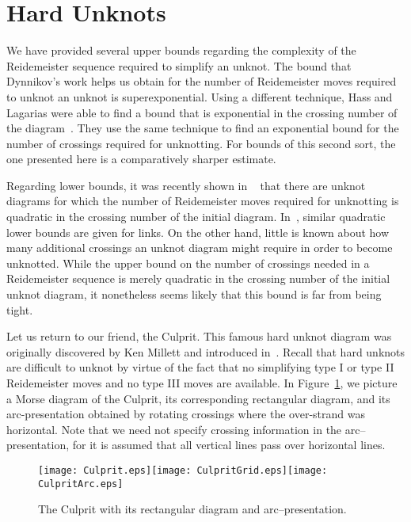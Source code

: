 \documentclass{amsart}
\begin{document}
\section{Hard Unknots}


We have provided several upper bounds regarding the complexity of the Reidemeister sequence required to simplify an unknot. The bound that Dynnikov's work helps us obtain for the number of Reidemeister moves required to unknot an unknot is superexponential. Using a different technique, Hass and Lagarias were able to find a bound that is exponential in the crossing number of the diagram~\cite{hl}. They use the same technique to find an exponential bound for the number of crossings required for unknotting. For bounds of this second sort, the one presented here is a comparatively sharper estimate. 

Regarding lower bounds, it was recently shown in ~\cite{hn} that there are unknot diagrams for which the number of Reidemeister moves required for unknotting is quadratic in the crossing number of the initial diagram. In~\cite{hayashi}, similar quadratic lower bounds are given for links. On the other hand, little is known about how many additional crossings an unknot diagram might require in order to become unknotted. While the upper bound on the number of crossings needed in a Reidemeister sequence is merely quadratic in the crossing number of the initial unknot diagram, it nonetheless seems likely that this bound is far from being tight. 

Let us return to our friend, the Culprit. This famous hard unknot diagram was originally discovered by Ken Millett and introduced in~\cite{Culprit}. Recall that hard unknots are difficult to unknot by virtue of the fact that no simplifying type I or type II Reidemeister moves and no type III moves are available. In Figure~\ref{culprit}, we picture a Morse diagram of the Culprit, its corresponding rectangular diagram, and its arc-presentation obtained by rotating crossings where the over-strand was horizontal. Note that we need not specify crossing information in the arc--presentation, for it is assumed that all vertical lines pass over horizontal lines.

\begin{figure}[h]
\begin{center}
\texttt{[image: Culprit.eps]}\texttt{[image: CulpritGrid.eps]}\texttt{[image: CulpritArc.eps]}
\end{center}
\caption{ \small{The Culprit with its rectangular diagram and arc--presentation.}}\label{culprit}
\end{figure}
\end{document}
